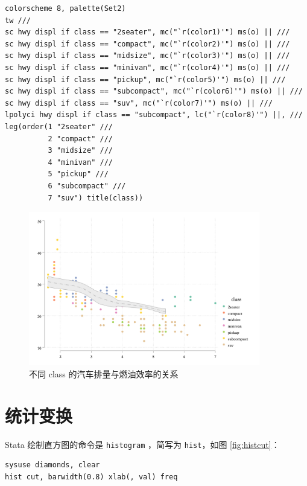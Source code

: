 \documentclass[]{ctexbook}
\begin{document}
\begin{lstlisting}
colorscheme 8, palette(Set2)
tw ///
sc hwy displ if class == "2seater", mc("`r(color1)'") ms(o) || ///
sc hwy displ if class == "compact", mc("`r(color2)'") ms(o) || ///
sc hwy displ if class == "midsize", mc("`r(color3)'") ms(o) || ///
sc hwy displ if class == "minivan", mc("`r(color4)'") ms(o) || ///
sc hwy displ if class == "pickup", mc("`r(color5)'") ms(o) || ///
sc hwy displ if class == "subcompact", mc("`r(color6)'") ms(o) || ///
sc hwy displ if class == "suv", mc("`r(color7)'") ms(o) || ///
lpolyci hwy displ if class == "subcompact", lc("`r(color8)'") ||, ///
leg(order(1 "2seater" ///
          2 "compact" ///
          3 "midsize" ///
          4 "minivan" ///
          5 "pickup" ///
          6 "subcompact" ///
          7 "suv") title(class))
\end{lstlisting}

\begin{figure}

{\centering \includegraphics[width=0.9\textwidth]{assets/lpolycihwydispl2} 

}

\caption{不同 class 的汽车排量与燃油效率的关系}\label{fig:lpolycihwydispl2}
\end{figure}

\hypertarget{section-34}{%
\section{统计变换}\label{section-34}}

Stata 绘制直方图的命令是 \texttt{histogram} ，简写为 \texttt{hist}，如图 \ref{fig:histcut}：

\begin{lstlisting}
sysuse diamonds, clear
hist cut, barwidth(0.8) xlab(, val) freq
\end{lstlisting}
\end{document}
